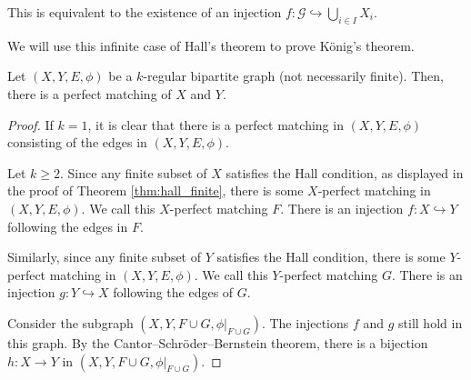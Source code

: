 \begin{remark}
  This is equivalent to the existence of an injection $f\colon \mathcal{G}\hookrightarrow \bigcup_{i\in I}X_i$.
\end{remark}

We will use this infinite case of Hall's theorem to prove König's theorem. 
\begin{theorem}
  Let $\left(X,Y,E,\phi\right)$ be a $k$-regular bipartite graph (not necessarily finite). Then, there is a perfect matching of $X$ and $Y$.\label{thm:konig}
\end{theorem}
\begin{proof}
  If $k = 1$, it is clear that there is a perfect matching in $\left(X,Y,E,\phi\right)$ consisting of the edges in $\left(X,Y,E,\phi\right)$.\newline

  Let $k\geq 2$. Since any finite subset of $X$ satisfies the Hall condition, as displayed in the proof of Theorem \ref{thm:hall_finite}, there is some $X$-perfect matching in $\left(X,Y,E,\phi\right)$. We call this $X$-perfect matching $F$. There is an injection $f\colon X\hookrightarrow Y$ following the edges in $F$.\newline

  Similarly, since any finite subset of $Y$ satisfies the Hall condition, there is some $Y$-perfect matching in $\left(X,Y,E,\phi\right)$. We call this $Y$-perfect matching $G$. There is an injection $g\colon Y\hookrightarrow X$ following the edges of $G$.\break

  Consider the subgraph $\left(X,Y,F\cup G,\phi|_{F\cup G}\right)$. The injections $f$ and $g$ still hold in this graph. By the Cantor--Schröder--Bernstein theorem, there is a bijection $h\colon X\rightarrow Y$ in $\left(X,Y,F\cup G,\phi|_{F\cup G}\right)$.
\end{proof}
